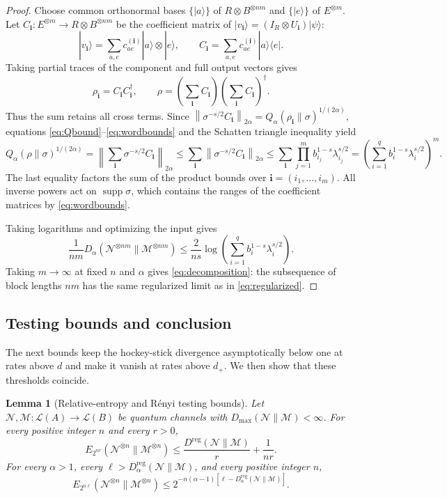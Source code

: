 \documentclass[11pt,letterpaper]{article}
\numberwithin{equation}{section}
\newtheorem{lemma}[theorem]{Lemma}
\newcommand{\N}{\mathcal N}
\newcommand{\M}{\mathcal M}
\newcommand{\supp}{\operatorname{supp}}
\newcommand{\reg}{\mathrm{reg}}
\newcommand{\Dt}{D}
\newcommand{\Qt}{Q}
\newcommand{\cL}{\mathcal L}
\newcommand{\norm}[1]{\left\lVert#1\right\rVert}
\begin{document}
\begin{proof}
Choose common orthonormal bases $\{|a\rangle\}$ of $R\otimes B^{\otimes nm}$ and $\{|e\rangle\}$ of $E^{\otimes m}$. Let $C_{\mathbf i}:E^{\otimes m}\to R\otimes B^{\otimes nm}$ be the coefficient matrix of $|v_{\mathbf i}\rangle=(I_R\otimes U_{\mathbf i})|\psi\rangle$:
\[
 |v_{\mathbf i}\rangle=\sum_{a,e}c^{(\mathbf i)}_{ae}|a\rangle\otimes|e\rangle,
 \qquad C_{\mathbf i}=\sum_{a,e}c^{(\mathbf i)}_{ae}|a\rangle\!\langle e|.
\]
Taking partial traces of the component and full output vectors gives
\[
 \rho_{\mathbf i}=C_{\mathbf i}C_{\mathbf i}^\dagger,
 \qquad \rho=\left(\sum_{\mathbf i}C_{\mathbf i}\right)
       \left(\sum_{\mathbf i}C_{\mathbf i}\right)^\dagger.
\]
Thus the sum retains all cross terms. Since
\(
 \norm{\sigma^{-s/2}C_{\mathbf i}}_{2\alpha}
 =\Qt_\alpha(\rho_{\mathbf i}\|\sigma)^{1/(2\alpha)},
\)
equations \eqref{eq:Qbound}--\eqref{eq:wordbounds} and the Schatten triangle inequality yield
\begin{equation}\label{eq:triangle}
 \Qt_\alpha(\rho\|\sigma)^{1/(2\alpha)}
 =\left\lVert\sum_{\mathbf i}\sigma^{-s/2}C_{\mathbf i}\right\rVert_{2\alpha}
 \le\sum_{\mathbf i}\norm{\sigma^{-s/2}C_{\mathbf i}}_{2\alpha}
 \le\sum_{\mathbf i}\prod_{j=1}^m b_{i_j}^{1-s}\lambda_{i_j}^{s/2}
 =\left(\sum_{i=1}^q b_i^{1-s}\lambda_i^{s/2}\right)^m.
\end{equation}
The last equality factors the sum of the product bounds over $\mathbf i=(i_1,\ldots,i_m)$.
All inverse powers act on $\supp\sigma$, which contains the ranges of the coefficient matrices by \eqref{eq:wordbounds}.

Taking logarithms and optimizing the input gives
\[
 \frac1{nm}\Dt_\alpha(\N^{\otimes nm}\|\M^{\otimes nm})
 \le\frac{2}{ns}\log\left(\sum_{i=1}^q b_i^{1-s}\lambda_i^{s/2}\right).
\]
Taking $m\to\infty$ at fixed $n$ and $\alpha$ gives \eqref{eq:decomposition}: the subsequence of block lengths $nm$ has the same regularized limit as in \eqref{eq:regularized}.
\end{proof}

\subsection{Testing bounds and conclusion}\label{sec:conclusion}
The next bounds keep the hockey-stick divergence asymptotically below one at rates above $d$ and make it vanish at rates above $d_+$. We then show that these thresholds coincide.

\begin{lemma}[Relative-entropy and R\'enyi testing bounds]\label{lem:testing}
Let $\N,\M:\cL(A)\to\cL(B)$ be quantum channels with $D_{\max}(\N\|\M)<\infty$. For every positive integer $n$ and every $r>0$,
\begin{equation}\label{eq:weak}
 E_{2^{nr}}(\N^{\otimes n}\|\M^{\otimes n})
 \le\frac{D^{\reg}(\N\|\M)}r+\frac1{nr}.
\end{equation}
For every $\alpha>1$, every $\ell>\Dt_\alpha^{\reg}(\N\|\M)$, and every positive integer $n$,
\begin{equation}\label{eq:high}
 E_{2^{n\ell}}(\N^{\otimes n}\|\M^{\otimes n})
 \le2^{-n(\alpha-1)[\ell-\Dt_\alpha^{\reg}(\N\|\M)]}.
\end{equation}
\end{lemma}
\end{document}
